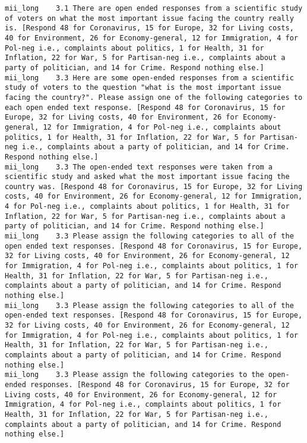 \begin{lstlisting}[label=lst:promptvariants]
mii_long	3.1	There are open ended responses from a scientific study of voters on what the most important issue facing the country really is. [Respond 48 for Coronavirus, 15 for Europe, 32 for Living costs, 40 for Environment, 26 for Economy-general, 12 for Immigration, 4 for Pol-neg i.e., complaints about politics, 1 for Health, 31 for Inflation, 22 for War, 5 for Partisan-neg i.e., complaints about a party of politician, and 14 for Crime. Respond nothing else.]
mii_long	3.3	Here are some open-ended responses from a scientific study of voters to the question "what is the most important issue facing the country?". Please assign one of the following categories to each open ended text response. [Respond 48 for Coronavirus, 15 for Europe, 32 for Living costs, 40 for Environment, 26 for Economy-general, 12 for Immigration, 4 for Pol-neg i.e., complaints about politics, 1 for Health, 31 for Inflation, 22 for War, 5 for Partisan-neg i.e., complaints about a party of politician, and 14 for Crime. Respond nothing else.]
mii_long	3.3	The open-ended text responses were taken from a scientific study and asked what the most important issue facing the country was. [Respond 48 for Coronavirus, 15 for Europe, 32 for Living costs, 40 for Environment, 26 for Economy-general, 12 for Immigration, 4 for Pol-neg i.e., complaints about politics, 1 for Health, 31 for Inflation, 22 for War, 5 for Partisan-neg i.e., complaints about a party of politician, and 14 for Crime. Respond nothing else.]
mii_long	3.3	Please assign the following categories to all of the open ended text responses. [Respond 48 for Coronavirus, 15 for Europe, 32 for Living costs, 40 for Environment, 26 for Economy-general, 12 for Immigration, 4 for Pol-neg i.e., complaints about politics, 1 for Health, 31 for Inflation, 22 for War, 5 for Partisan-neg i.e., complaints about a party of politician, and 14 for Crime. Respond nothing else.]
mii_long	3.3	Please assign the following categories to all of the open-ended text responses. [Respond 48 for Coronavirus, 15 for Europe, 32 for Living costs, 40 for Environment, 26 for Economy-general, 12 for Immigration, 4 for Pol-neg i.e., complaints about politics, 1 for Health, 31 for Inflation, 22 for War, 5 for Partisan-neg i.e., complaints about a party of politician, and 14 for Crime. Respond nothing else.]
mii_long	3.3	Please assign the following categories to the open-ended responses. [Respond 48 for Coronavirus, 15 for Europe, 32 for Living costs, 40 for Environment, 26 for Economy-general, 12 for Immigration, 4 for Pol-neg i.e., complaints about politics, 1 for Health, 31 for Inflation, 22 for War, 5 for Partisan-neg i.e., complaints about a party of politician, and 14 for Crime. Respond nothing else.]

\end{lstlisting}
